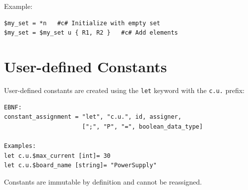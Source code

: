 Example:
\begin{verbatim}
$my_set = *n   #c# Initialize with empty set
$my_set = $my_set u { R1, R2 }   #c# Add elements
\end{verbatim}

\section{User-defined Constants}
User-defined constants are created using the \texttt{let} keyword with the \texttt{c.u.} prefix:
\begin{verbatim}
EBNF:
constant_assignment = "let", "c.u.", id, assigner, 
                      [";", "P", "=", boolean_data_type]

Examples:
let c.u.$max_current [int]= 30
let c.u.$board_name [string]= "PowerSupply"
\end{verbatim}
Constants are immutable by definition and cannot be reassigned.

